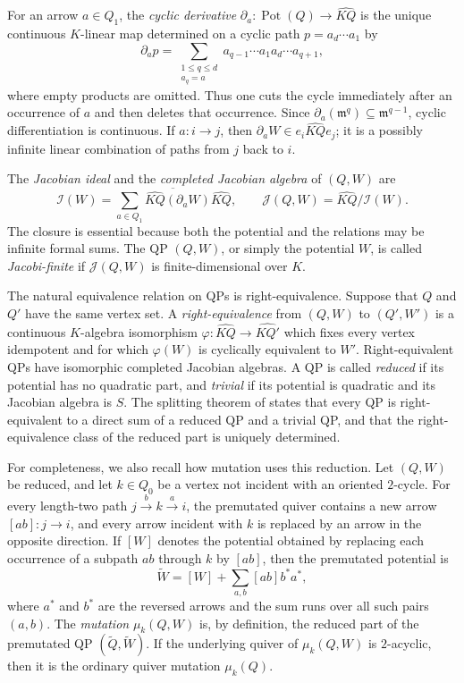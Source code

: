 \documentclass[11pt,letterpaper,reqno]{amsart}
\theoremstyle{definition}
\newcommand{\m}{\mathfrak m}
\newcommand{\widehatKQ}{\widehat{KQ}}
\newcommand{\Jac}{\mathcal J}
\begin{document}
	For an arrow $a\in Q_1$, the \emph{cyclic derivative} $\partial_a:\operatorname{Pot}(Q)\longrightarrow\widehatKQ$ is the unique continuous $K$-linear map determined on a cyclic path
	$p=a_d\cdots a_1$ by
	\[
	\partial_a p
	=\sum_{\substack{1\leq q\leq d\\a_q=a}}
	a_{q-1}\cdots a_1a_d\cdots a_{q+1},
	\]
	where empty products are omitted.  Thus one cuts the cycle immediately after an occurrence of $a$ and then deletes that occurrence.  Since
	$\partial_a(\m^q)\subseteq\m^{q-1}$, cyclic differentiation is continuous.
	If $a:i\to j$, then $\partial_aW\in e_i\widehatKQ e_j$; it is a possibly infinite linear combination of paths from $j$ back to $i$.
	
	The \emph{Jacobian ideal} and the \emph{completed Jacobian algebra} of
	$(Q,W)$ are
	\[
	\mathcal I(W)
	=\overline{\sum_{a\in Q_1}
		\widehatKQ(\partial_aW)\widehatKQ},
	\qquad
	\Jac(Q,W)=\widehatKQ/\mathcal I(W).
	\]
	The closure is essential because both the potential and the relations may be
	infinite formal sums.  The QP $(Q,W)$, or simply the potential $W$, is called
	\emph{Jacobi-finite} if $\Jac(Q,W)$ is finite-dimensional over $K$.
	
	The natural equivalence relation on QPs is right-equivalence.  Suppose that
	$Q$ and $Q'$ have the same vertex set.  A \emph{right-equivalence} from
	$(Q,W)$ to $(Q',W')$ is a continuous $K$-algebra isomorphism $\varphi:\widehat{KQ}\longrightarrow\widehat{KQ'}$ which fixes every vertex idempotent and for which $\varphi(W)$ is cyclically
	equivalent to $W'$.  Right-equivalent QPs have isomorphic completed Jacobian
	algebras.  A QP is called \emph{reduced} if its potential has no quadratic
	part, and \emph{trivial} if its potential is quadratic and its Jacobian
	algebra is $S$.  The splitting theorem of
	\cite{DerksenWeymanZelevinsky} states that every QP is right-equivalent to a
	direct sum of a reduced QP and a trivial QP, and that the right-equivalence
	class of the reduced part is uniquely determined.
	
	For completeness, we also recall how mutation uses this reduction.  Let
	$(Q,W)$ be reduced, and let $k\in Q_0$ be a vertex not incident with an oriented $2$-cycle. For every length-two path $j\xrightarrow{\,b\,}k\xrightarrow{\,a\,}i$, the premutated quiver contains a new arrow $[ab]:j\to i$, and every arrow
	incident with $k$ is replaced by an arrow in the opposite direction.  If
	$[W]$ denotes the potential obtained by replacing each occurrence of a
	subpath $ab$ through $k$ by $[ab]$, then the premutated potential is
	\[
	\widetilde W=[W]+\sum_{a,b}[ab]b^*a^*,
	\]
	where $a^*$ and $b^*$ are the reversed arrows and the sum runs over all such
	pairs $(a,b)$.  The \emph{mutation} $\mu_k(Q,W)$ is, by definition, the reduced part
	of the premutated QP $(\widetilde Q,\widetilde W)$. If the underlying quiver of $\mu_k(Q,W)$ is $2$-acyclic, then it is
the ordinary quiver mutation $\mu_k(Q)$.
	
\end{document}
